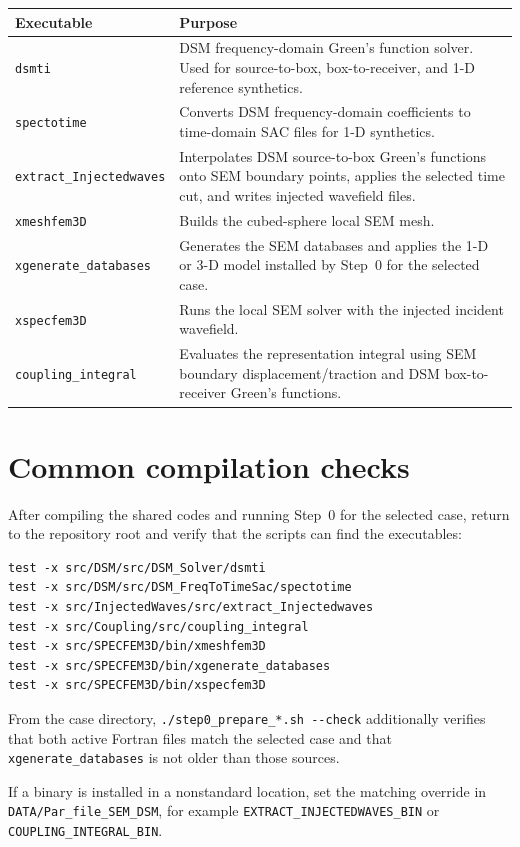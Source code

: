 \documentclass[11pt,oneside]{book}
\DeclareRobustCommand{\code}[1]{\nolinkurl{#1}}
\begin{document}
\begin{longtable}{L{0.29\textwidth}L{0.62\textwidth}}
\toprule
Executable & Purpose \\
\midrule
\code{dsmti} & DSM frequency-domain Green's function solver. Used for
source-to-box, box-to-receiver, and 1-D reference synthetics. \\
\code{spectotime} & Converts DSM frequency-domain coefficients to time-domain
SAC files for 1-D synthetics. \\
\code{extract_Injectedwaves} & Interpolates DSM source-to-box Green's functions
onto SEM boundary points, applies the selected time cut, and writes injected
wavefield files. \\
\code{xmeshfem3D} & Builds the cubed-sphere local SEM mesh. \\
\code{xgenerate_databases} & Generates the SEM databases and applies the
1-D or 3-D model installed by Step~0 for the selected case. \\
\code{xspecfem3D} & Runs the local SEM solver with the injected incident
wavefield. \\
\code{coupling_integral} & Evaluates the representation integral using SEM
boundary displacement/traction and DSM box-to-receiver Green's functions. \\
\bottomrule
\end{longtable}

\section{Common compilation checks}

After compiling the shared codes and running Step~0 for the selected case,
return to the repository root and verify that the scripts can find the
executables:
\begin{lstlisting}
test -x src/DSM/src/DSM_Solver/dsmti
test -x src/DSM/src/DSM_FreqToTimeSac/spectotime
test -x src/InjectedWaves/src/extract_Injectedwaves
test -x src/Coupling/src/coupling_integral
test -x src/SPECFEM3D/bin/xmeshfem3D
test -x src/SPECFEM3D/bin/xgenerate_databases
test -x src/SPECFEM3D/bin/xspecfem3D
\end{lstlisting}

From the case directory, \code{./step0_prepare_*.sh --check} additionally
verifies that both active Fortran files match the selected case and that
\code{xgenerate_databases} is not older than those sources.

If a binary is installed in a nonstandard location, set the matching override
in \code{DATA/Par_file_SEM_DSM}, for example
\code{EXTRACT_INJECTEDWAVES_BIN} or \code{COUPLING_INTEGRAL_BIN}.
\end{document}
